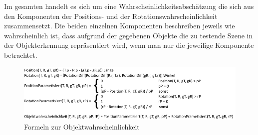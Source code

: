 Im gesamten handelt es sich um eine Wahrscheinlichkeitsabschätzung die sich aus den Komponenten der Positions- und der Rotationswahrscheinlichkeit zusammensetzt. Die beiden einzelnen Komponenten beschreiben jeweils wie wahrscheinlich ist, dass aufgrund der gegebenen Objekte die zu testende Szene in der Objekterkennung repräsentiert wird, wenn man nur die jeweilige Komponente betrachtet.
\begin{figure}
	\centering
	\includegraphics[width=14cm]{bilder/Formeln.pdf}
	\caption{Formeln zur Objektwahrscheinlichkeit}
	\label{img:formelnObj}
\end{figure}

